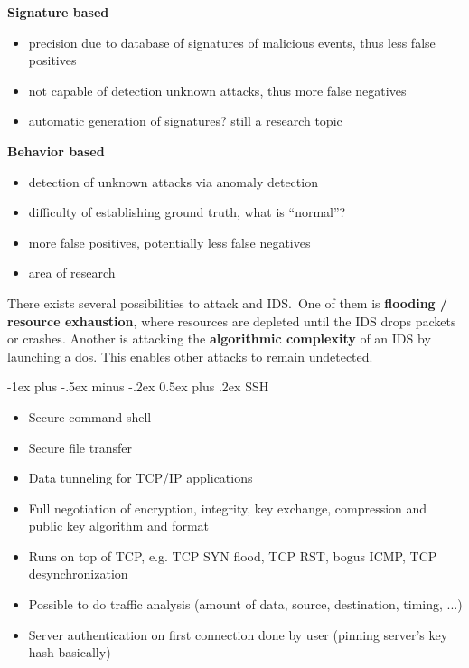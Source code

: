 \documentclass[a4paper,twocolumn]{article}
\makeatletter
\newenvironment{itemization}[1][\small]{%
    \begin{itemize}[leftmargin=*]
            #1
        }{%
    \end{itemize}
}
\newcommand{\half}[3][\scriptsize]{%
    #1
    \begin{minipage}[t]{0.22\textwidth}
        #2
    \end{minipage}
    \hfill
    \vline
    \hfill
    \begin{minipage}[t]{0.22\textwidth}
        #3
    \end{minipage}
}
\renewcommand{\section}{%
    \@startsection{section}{1}{0mm}%
    {-1ex plus -.5ex minus -.2ex}%
    {0.5ex plus .2ex}%
    {\normalfont\normalsize\bfseries\sectionrule{12pt}{0.4pt}{0pt}{0pt}}
}
\makeatother
\begin{document}
\begin{footnotesize}
    \half{%
        \textbf{Signature based}
        \begin{itemization}[\tiny]
        \item precision due to database of signatures of malicious events, thus less false positives
        \item not capable of detection unknown attacks, thus more false negatives 
        \item automatic generation of signatures? still a research topic
        \end{itemization}
    }{%
        \textbf{Behavior based}
        \begin{itemization}[\tiny]
        \item detection of unknown attacks via anomaly detection 
        \item difficulty of establishing ground truth, what is ``normal''?
        \item more false positives, potentially less false negatives
        \item area of research
        \end{itemization}
    }

    There exists several possibilities to attack and IDS.\ One of them is \textbf{flooding / resource exhaustion}, where resources are depleted until the IDS drops packets or crashes. Another is attacking the \textbf{algorithmic complexity} of an IDS by launching a dos. This enables other attacks to remain undetected.

\section{SSH}
\begin{itemization}
\item Secure command shell
\item Secure file transfer
\item Data tunneling for TCP/IP applications
\item Full negotiation of encryption, integrity, key exchange, compression and public key algorithm and format
\item Runs on top of TCP, e.g. TCP SYN flood, TCP RST, bogus ICMP, TCP desynchronization
\item Possible to do traffic analysis (amount of data, source, destination, timing, ...)
\item Server authentication on first connection done by user (pinning server's key hash basically)
\end{itemization}


\end{footnotesize}
\end{document}
